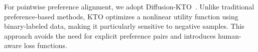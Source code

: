 


For pointwise preference alignment, we adopt Diffusion-KTO~\cite{ethayarajh2024ktomodelalignmentprospect}.
Unlike traditional preference-based methods, KTO optimizes a nonlinear utility function using binary-labeled data, making it particularly sensitive to negative samples. This approach avoids the need for explicit preference pairs and introduces human-aware loss functions.

